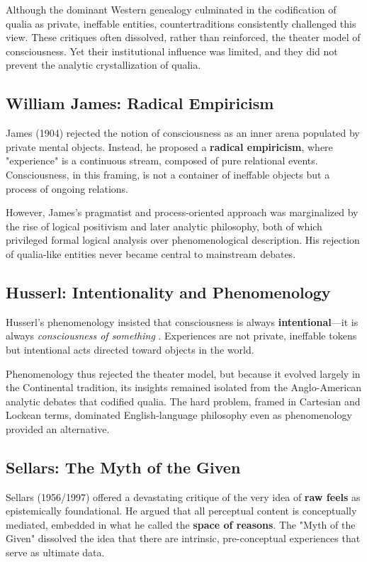 \documentclass[11pt,a4paper]{article}
\begin{document}
Although the dominant Western genealogy culminated in the codification of qualia as private, ineffable entities, countertraditions consistently challenged this view. These critiques often dissolved, rather than reinforced, the theater model of consciousness. Yet their institutional influence was limited, and they did not prevent the analytic crystallization of qualia.

\subsection{William James: Radical Empiricism}

James (1904) rejected the notion of consciousness as an inner arena populated by private mental objects. Instead, he proposed a \textbf{radical empiricism}, where "experience" is a continuous stream, composed of pure relational events. Consciousness, in this framing, is not a container of ineffable objects but a process of ongoing relations.

However, James's pragmatist and process-oriented approach was marginalized by the rise of logical positivism and later analytic philosophy, both of which privileged formal logical analysis over phenomenological description. His rejection of qualia-like entities never became central to mainstream debates.

\subsection{Husserl: Intentionality and Phenomenology}

Husserl's phenomenology insisted that consciousness is always \textbf{intentional}—it is always \emph{consciousness of something} \cite{husserl1983}. Experiences are not private, ineffable tokens but intentional acts directed toward objects in the world.

Phenomenology thus rejected the theater model, but because it evolved largely in the Continental tradition, its insights remained isolated from the Anglo-American analytic debates that codified qualia. The hard problem, framed in Cartesian and Lockean terms, dominated English-language philosophy even as phenomenology provided an alternative.

\subsection{Sellars: The Myth of the Given}

Sellars (1956/1997) offered a devastating critique of the very idea of \textbf{raw feels} as epistemically foundational. He argued that all perceptual content is conceptually mediated, embedded in what he called the \textbf{space of reasons}. The "Myth of the Given" dissolved the idea that there are intrinsic, pre-conceptual experiences that serve as ultimate data.
\end{document}
